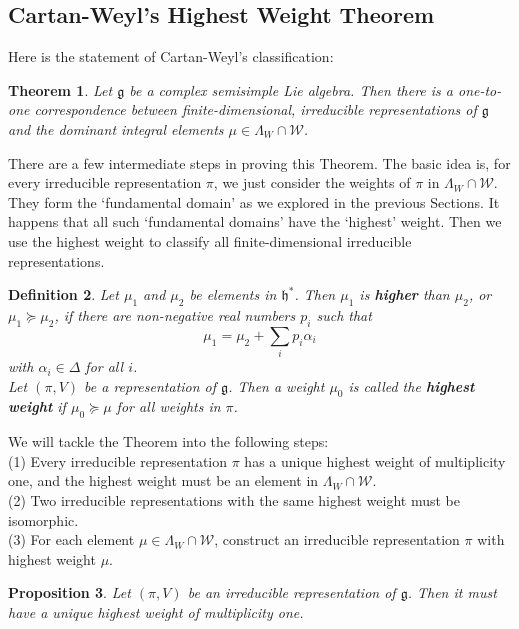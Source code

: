 \documentclass[11pt]{article}
\newtheorem{theorem}{Theorem}[section]
\newtheorem{proposition}[theorem]{Proposition}
\newtheorem{definition}[theorem]{Definition}
\newcommand{\mc}[1]{\mathcal{#1}}
\newcommand{\mf}[1]{\mathfrak{#1}}
\begin{document}
\subsection{Cartan-Weyl's Highest Weight Theorem}
Here is the statement of Cartan-Weyl's classification:
\begin{theorem}
Let $\mf{g}$ be a complex semisimple Lie algebra. Then there is a one-to-one correspondence between finite-dimensional, irreducible representations of $\mf{g}$ and the dominant integral elements $\mu \in \Lambda_W \cap \mc{W}$.
\end{theorem}
There are a few intermediate steps in proving this Theorem. The basic idea is, for every irreducible representation $\pi$, we just consider the weights of $\pi$ in $\Lambda_W \cap \mc{W}$. They form the `fundamental domain' as we explored in the previous Sections. It happens that all such `fundamental domains' have the `highest' weight. Then we use the highest weight to classify all finite-dimensional irreducible representations.
\begin{definition} \label{higher}
Let $\mu_1$ and $\mu_2$ be elements in $\mf{h}^*$. Then $\mu_1$ is \textbf{higher} than $\mu_2$, or $\mu_1 \succeq \mu_2$, if there are non-negative real numbers $p_i$ such that
$$\mu_1 = \mu_2 + \sum_i p_i \alpha_i$$
with $\alpha_i \in \Delta$ for all $i$. \\
Let $(\pi,V)$ be a representation of $\mf{g}$. Then a weight $\mu_0$ is called the \textbf{highest weight} if $\mu_0 \succeq \mu$ for all weights in $\pi$.
\end{definition}
We will tackle the Theorem into the following steps:\\
(1) Every irreducible representation $\pi$ has a unique highest weight of multiplicity one, and the highest weight must be an element in $\Lambda_W \cap \mc{W}$.\\
(2) Two irreducible representations with the same highest weight must be isomorphic.\\
(3) For each element $\mu \in \Lambda_W \cap \mc{W}$, construct an irreducible representation $\pi$ with highest weight $\mu$.\\
\begin{proposition}
Let $(\pi,V)$ be an irreducible representation of $\mf{g}$. Then it must have a unique highest weight of multiplicity one.
\end{proposition}
\end{document}
